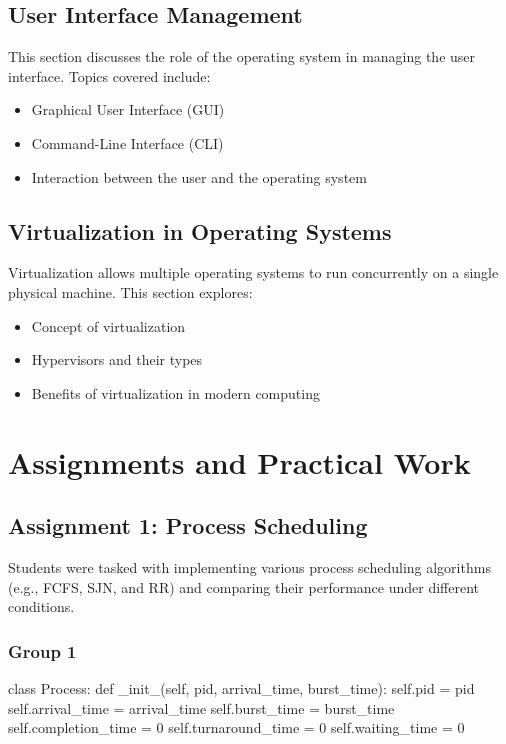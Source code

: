 \documentclass[12pt]{article}
\begin{document}
\subsection{User Interface Management}
This section discusses the role of the operating system in managing the user interface. Topics covered include:
\begin{itemize}
    \item Graphical User Interface (GUI)
    \item Command-Line Interface (CLI)
    \item Interaction between the user and the operating system
\end{itemize}

\subsection{Virtualization in Operating Systems}
Virtualization allows multiple operating systems to run concurrently on a single physical machine. This section explores:
\begin{itemize}
    \item Concept of virtualization
    \item Hypervisors and their types
    \item Benefits of virtualization in modern computing
\end{itemize}

\section{Assignments and Practical Work}
\subsection{Assignment 1: Process Scheduling}
Students were tasked with implementing various process scheduling algorithms (e.g., FCFS, SJN, and RR) and comparing their performance under different conditions.
\subsubsection{Group 1}
\begin{python}
    class Process:
    def _init_(self, pid, arrival_time, burst_time):
        self.pid = pid
        self.arrival_time = arrival_time
        self.burst_time = burst_time
        self.completion_time = 0
        self.turnaround_time = 0
        self.waiting_time = 0
\end{python}
\end{document}
